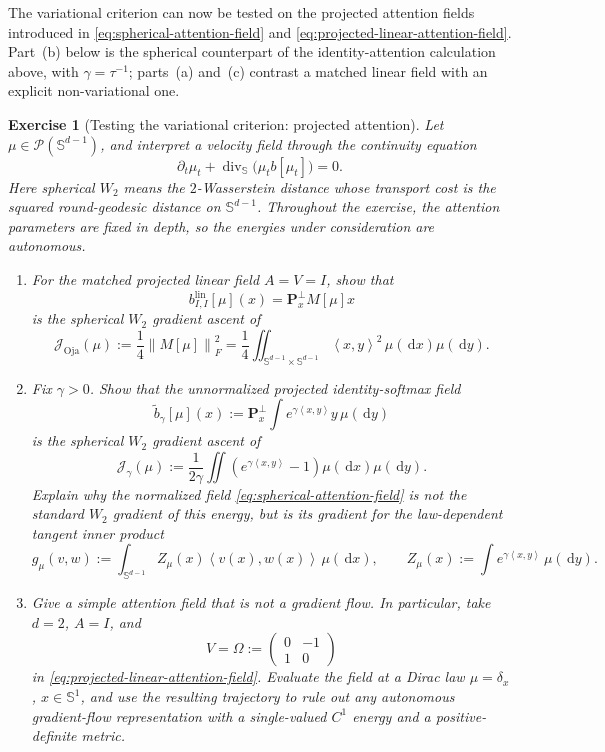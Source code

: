 \documentclass[11pt]{amsart}
\numberwithin{equation}{section}
\theoremstyle{plain}
\newtheorem{exercise}[theorem]{Exercise}
\newcommand{\cP}{\mathcal{P}}
\newcommand{\dd}{\,\mathrm{d}}
\newcommand{\norm}[1]{\left\lVert#1\right\rVert}
\newcommand{\ip}[2]{\left\langle#1,#2\right\rangle}
\DeclareMathOperator{\diver}{div}
\begin{document}
The variational criterion can now be tested on the projected attention
fields introduced in \eqref{eq:spherical-attention-field} and
\eqref{eq:projected-linear-attention-field}.  Part~(b) below is the spherical
counterpart of the identity-attention calculation above, with
$\gamma=\tau^{-1}$; parts~(a) and~(c) contrast a matched linear field with an
explicit non-variational one.


\begin{exercise}[Testing the variational criterion: projected attention]
\label{ex:gradient-and-nongradient-attention}
Let $\mu\in\cP(\mathbb S^{d-1})$, and interpret a velocity field through
the continuity equation
\[
 \partial_t\mu_t+\diver_{\mathbb S}
 \bigl(\mu_t b[\mu_t]\bigr)=0.
\]
Here spherical $W_2$ means the $2$-Wasserstein distance whose transport cost
is the squared round-geodesic distance on $\mathbb S^{d-1}$.
Throughout the exercise, the attention parameters are fixed in depth, so the
energies under consideration are autonomous.
\begin{enumerate}[label=(\alph*),leftmargin=*]
\item For the matched projected linear field $A=V=I$, show that
\[
 b_{I,I}^{\mathrm{lin}}[\mu](x)
 =\mathbf P_x^\perp M[\mu]x
\]
is the spherical $W_2$ gradient ascent of
\[
 \mathcal J_{\mathrm{Oja}}(\mu)
 :=\frac14\norm{M[\mu]}_F^2
 =\frac14\iint_{\mathbb S^{d-1}\times\mathbb S^{d-1}}
       \ip{x}{y}^2\,\mu(\dd x)\mu(\dd y).
\]

\item Fix $\gamma>0$.  Show that the unnormalized projected
identity-softmax field
\[
 \widetilde b_\gamma[\mu](x)
 :=\mathbf P_x^\perp\int e^{\gamma\ip{x}{y}}y\,\mu(\dd y)
\]
is the spherical $W_2$ gradient ascent of
\[
 \mathcal J_\gamma(\mu)
 :=\frac1{2\gamma}
 \iint\left(e^{\gamma\ip{x}{y}}-1\right)
       \mu(\dd x)\mu(\dd y).
\]
Explain why the normalized field \eqref{eq:spherical-attention-field} is not
the standard $W_2$ gradient of this energy, but is its gradient for the
law-dependent tangent inner product
\[
 g_\mu(v,w)
 :=\int_{\mathbb S^{d-1}}Z_\mu(x)\ip{v(x)}{w(x)}\,\mu(\dd x),
 \qquad
 Z_\mu(x):=\int e^{\gamma\ip{x}{y}}\,\mu(\dd y).
\]

\item Give a simple attention field that is not a gradient flow.  In
particular, take $d=2$, $A=I$, and
\[
 V=\Omega:=\begin{pmatrix}0&-1\\1&0\end{pmatrix}
\]
in \eqref{eq:projected-linear-attention-field}.  Evaluate the field at a
Dirac law $\mu=\delta_x$, $x\in\mathbb S^1$, and use the resulting trajectory
to rule out any autonomous gradient-flow representation with a single-valued
$C^1$ energy and a positive-definite metric.
\end{enumerate}
\end{exercise}
\end{document}
